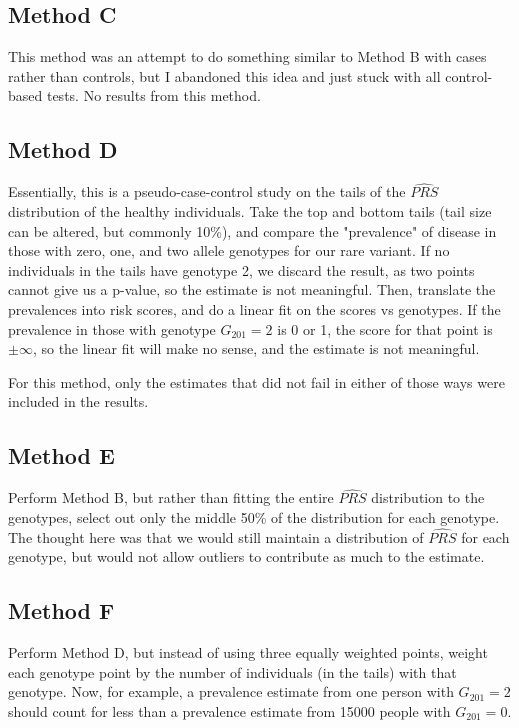 \documentclass[11pt]{article} %
\begin{document}
\subsection{Method C}
This method was an attempt to do something similar to Method B with cases rather than controls, but I abandoned this idea and just stuck with all control-based tests. No results from this method.

\subsection{Method D}
Essentially, this is a pseudo-case-control study on the tails of the $\widehat{PRS}$ distribution of the healthy individuals. Take the top and bottom tails (tail size can be altered, but commonly 10\%), and compare the "prevalence" of disease in those with zero, one, and two allele genotypes for our rare variant. If no individuals in the tails have genotype 2, we discard the result, as two points cannot give us a p-value, so the estimate is not meaningful. Then, translate the prevalences into risk scores, and do a linear fit on the scores vs genotypes. If the prevalence in those with genotype $G_{201} = 2$ is 0 or 1, the score for that point is $\pm \infty$, so the linear fit will make no sense, and the estimate is not meaningful.

For this method, only the estimates that did not fail in either of those ways were included in the results.

\subsection{Method E}
Perform Method B, but rather than fitting the entire $\widehat{PRS}$ distribution to the genotypes, select out only the middle 50\% of the distribution for each genotype. The thought here was that we would still maintain a distribution of $\widehat{PRS}$ for each genotype, but would not allow outliers to contribute as much to the estimate.

\subsection{Method F}
Perform Method D, but instead of using three equally weighted points, weight each genotype point by the number of individuals (in the tails) with that genotype. Now, for example, a prevalence estimate from one person with $G_{201}=2$ should count for less than a prevalence estimate from 15000 people with $G_{201}=0$.
\end{document}
